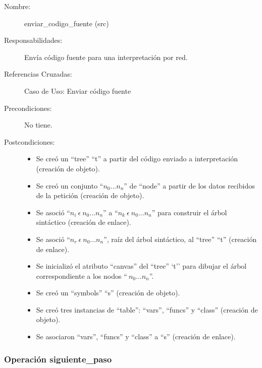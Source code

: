 	\begin{description}
		\item [Nombre:] enviar\_codigo\_fuente (src)
		\item [Responsabilidades:] Envía código fuente para una interpretación por red.
		\item [Referencias Cruzadas: ] Caso de Uso: Enviar código fuente
      \item [Precondiciones:] No tiene.
      \item [Postcondiciones:] \hfill
      \begin {itemize}
         \item Se creó un ``tree'' ``t'' a partir del código enviado a interpretación (creación de objeto).
         \item Se creó un conjunto ``$n_0...n_n$'' de ``node'' a partir de los datos recibidos de la petición (creación de objeto).
         \item Se asoció ``$n_i\ \epsilon\ n_0...n_n$'' a ``$n_k\ \epsilon\ n_0...n_n$'' para construir el árbol sintáctico (creación de enlace).
         \item Se asoció  ``$n_r\ \epsilon\ n_0...n_n$'', raíz del árbol sintáctico, al ``tree'' ``t'' (creación de enlace).
         \item Se inicializó el atributo ``canvas'' del ``tree'' `t'' para dibujar el árbol correspondiente a los nodos ``$\ n_0...n_n$''.
         \item Se creó un ``symbols'' ``s'' (creación de objeto).
         \item Se creó tres instancias de ``table'': ``vars'', ``funcs'' y ``class'' (creación de objeto).
         \item Se asociaron ``vars'', ``funcs'' y ``class'' a ``s'' (creación de enlace).
      \end{itemize}
	\end{description}


\subsubsection{Operación siguiente\_paso}

